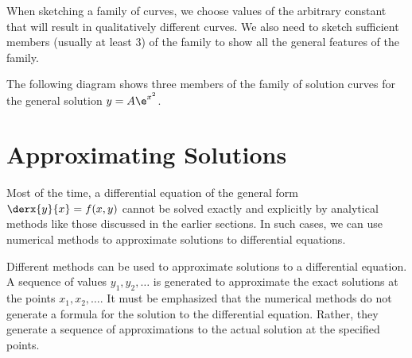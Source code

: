 When sketching a family of curves, we choose values of the arbitrary constant that will result in qualitatively different curves. We also need to sketch sufficient members (usually at least 3) of the family to show all the general features of the family.

\begin{example}
    The following diagram shows three members of the family of solution curves for the general solution $y = A\e^{x^2}$.

    \begin{figure}[H]
        \centering
        \caption{}
    \end{figure}
\end{example}

\section{Approximating Solutions}

Most of the time, a differential equation of the general form $\derx{y}{x} = f(x, y)$ cannot be solved exactly and explicitly by analytical methods like those discussed in the earlier sections. In such cases, we can use numerical methods to approximate solutions to differential equations.

Different methods can be used to approximate solutions to a differential equation. A sequence of values $y_1, y_2, \dots$ is generated to approximate the exact solutions at the points $x_1, x_2, \dots$. It must be emphasized that the numerical methods do not generate a formula for the solution to the differential equation. Rather, they generate a sequence of approximations to the actual solution at the specified points.

